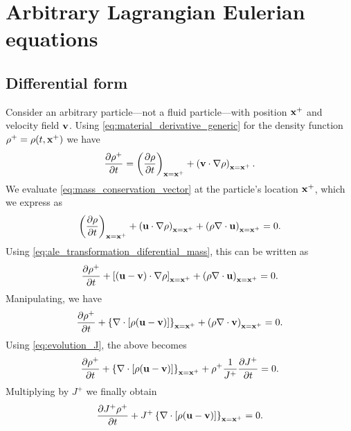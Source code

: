 \documentclass[oneside,a4paper,11pt]{report}
\begin{document}
\section{Arbitrary Lagrangian Eulerian equations}
\subsection{Differential form} 
Consider an arbitrary particle---not a fluid particle---with position $\mathbf{x}^+$ and velocity field $\mathbf{v}$. Using \cref{eq:material_derivative_generic} for the density function $\rho^+ = \rho(t,\mathbf{x}^+)$ we have
\begin{equation}
\label{eq:ale_transformation_diferential_mass}
    \frac{\partial \rho^+}{\partial t} = \left (\frac{\partial \rho}{\partial t} \right)_{\mathbf{x} = \mathbf{x}^+} + \left (\mathbf{v} \cdot \nabla \rho \right)_{\mathbf{x} = \mathbf{x}^+} .
\end{equation}
We evaluate \cref{eq:mass_conservation_vector} at the particle's location $\mathbf{x}^+$, which we express as
\begin{equation}
    \left ( \frac{\partial \rho}{\partial t} \right)_{\mathbf{x} = \mathbf{x}^+} + \left ( \mathbf{u} \cdot \nabla \rho \right)_{\mathbf{x} = \mathbf{x}^+} + \left ( \rho \nabla \cdot \mathbf{u} \right)_{\mathbf{x} = \mathbf{x}^+}= 0.
\end{equation}
Using \cref{eq:ale_transformation_diferential_mass}, this can be written as
\begin{equation}
    \frac{\partial \rho^+}{\partial t} + \left [ ( \mathbf{u} - \mathbf{v}) \cdot \nabla \rho \right]_{\mathbf{x} = \mathbf{x}^+} + \left (\rho \nabla \cdot \mathbf{u} \right)_{\mathbf{x} = \mathbf{x}^+}= 0.
\end{equation}
Manipulating, we have
\begin{equation}
    \frac{\partial \rho^+}{\partial t} + \left \{ \nabla \cdot [ \rho ( \mathbf{u} - \mathbf{v}) ] \right \}_{\mathbf{x} = \mathbf{x}^+} + \left (\rho \nabla \cdot \mathbf{v} \right)_{\mathbf{x} = \mathbf{x}^+}= 0.
\end{equation}
Using \cref{eq:evolution_J}, the above becomes
\begin{equation}
    \frac{\partial \rho^+}{\partial t} + \left \{ \nabla \cdot [ \rho ( \mathbf{u} - \mathbf{v}) ] \right \}_{\mathbf{x} = \mathbf{x}^+} + \rho^+ \frac{1}{J^+} \frac{\partial J^+}{\partial t}= 0.
\end{equation}
Multiplying by $J^+$ we finally obtain 
\begin{equation}
    \frac{\partial J^+ \rho^+}{\partial t} + J^+ \left \{ \nabla \cdot [ \rho ( \mathbf{u} - \mathbf{v}) ] \right \}_{\mathbf{x} = \mathbf{x}^+} = 0.
\end{equation}
\end{document}
